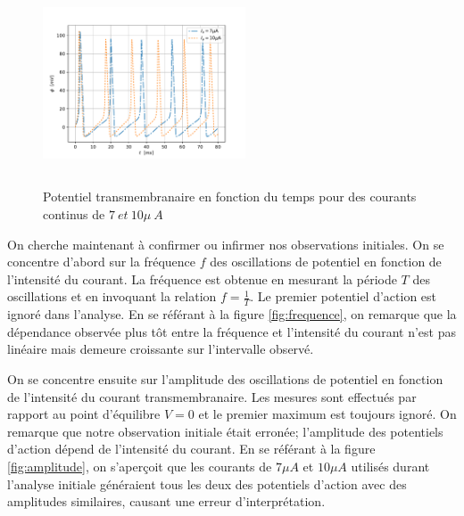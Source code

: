 \documentclass{article}
\begin{document}
\begin{figure}[H]
	\includegraphics[width=6cm, height=6cm]{Potentiel_courant_continu.pdf}
	\centering
	\caption{Potentiel transmembranaire en fonction du temps pour des courants continus de $7\ et\ 10 \mu \  A$}
	\label{fig:double_continuous}
\end{figure}

On cherche maintenant à confirmer ou infirmer nos observations initiales. On se concentre d'abord sur la fréquence $f$ des oscillations de potentiel en fonction de l'intensité du courant. La fréquence est obtenue en mesurant la période $T$ des oscillations et en invoquant la relation $f=\frac{1}{T}$. Le premier potentiel d'action est ignoré dans l'analyse. En se référant à la figure \ref{fig:frequence}, on remarque que la dépendance observée plus tôt entre la fréquence et l'intensité du courant n'est pas linéaire mais demeure croissante sur l'intervalle observé.

On se concentre ensuite sur l'amplitude des oscillations de potentiel en fonction de l'intensité du courant transmembranaire. Les mesures sont effectués par rapport au point d'équilibre $V=0$ et le premier maximum est toujours ignoré. On remarque que notre observation initiale était erronée; l'amplitude des potentiels d'action dépend de l'intensité du courant. En se référant à la figure \ref{fig:amplitude}, on s'aperçoit que les courants de  $7 \mu A$ et  $10 \mu A$ utilisés durant l'analyse initiale généraient tous les deux des potentiels d'action avec des amplitudes similaires, causant une erreur d'interprétation.
\end{document}
